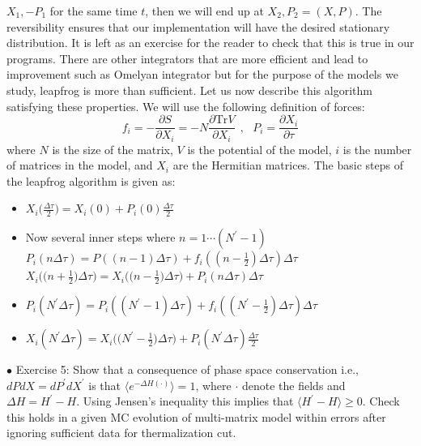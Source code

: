 \documentclass[letter,11pt]{article}
\begin{document}
$X_{1},-P_{1} $ for the same time $t$, then we will end up at $X_{2},P_{2} = (X,P)$. The reversibility ensures that our implementation will have the desired stationary distribution. It is left as an exercise for the reader to check that this is true in our programs. There are other integrators that are more efficient and lead to improvement such as Omelyan integrator but for the purpose of the models we study, leapfrog is more than sufficient. Let us now describe this algorithm satisfying these properties. We will use the following definition of forces:
\begin{equation}
	f_{i} = -\frac{\partial S}{\partial X_i} = -N\frac{\partial \mbox{Tr} V}{\partial X_i} ~~,~~~ P_i = \frac{\partial X_i}{\partial \tau}
\end{equation} 
where $N$ is the size of the matrix, $V$ is the potential of the model, $i$ is the number of 
matrices in the model, and $X_{i}$ are the Hermitian matrices. 
The basic steps of the leapfrog algorithm is given as: 
\vspace{7mm} 
\begin{center}
\begin{itemize}
	\item $X_{i}\big(\frac{\Delta \tau}{2}\big) = X_{i}(0) + P_{i}(0)\frac{\Delta \tau}{2}$
	\item Now several inner steps where $n =  1 \cdots (N^{\prime}-1)$
	\subitem $P_{i}(n \Delta \tau) = P((n-1) \Delta \tau) + f_{i}((n-\frac{1}{2}) \Delta \tau) \Delta \tau$ 
	\subitem $X_{i}\Big(\Big(n + \frac{1}{2}\Big) \Delta \tau\Big) = X_{i}\Big(\Big(n - \frac{1}{2}\Big) \Delta \tau\Big)  + P_{i}(n \Delta \tau) \Delta \tau$
	\item $P_{i}(N^{\prime} \Delta \tau) = P_{i}((N^{\prime}-1) \Delta \tau) + f_{i}((N^{\prime}-\frac{1}{2}) \Delta \tau) \Delta \tau$ 
	\item $X_{i}(N^{\prime} \Delta \tau) = X_{i}\Big(\Big(N^{\prime} - \frac{1}{2}\Big) \Delta \tau\Big) + P_{i}(N^{\prime} \Delta \tau) \frac{\Delta \tau}{2}$ 
\end{itemize} 
\end{center}
\vspace{7mm} 
    \begin{mdframed}[backgroundcolor=blue!3] 
    $\bullet$ Exercise 5: Show that a consequence of phase space conservation i.e., $dPdX = dP^{\prime}dX^{\prime}$ is that $ \langle e^{-\Delta H(\boldsymbol{\cdot})} \rangle = 1$, where $\boldsymbol{\cdot}$ denote the fields and $ \Delta H  = H^{\prime} - H $. Using Jensen's inequality this implies that $\langle H^{\prime} - H \rangle  \ge 0$. Check this holds in a given MC evolution 
    of multi-matrix model within errors after ignoring sufficient data for thermalization cut.
    \end{mdframed}
\end{document}
